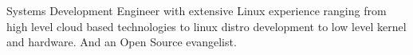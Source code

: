 Systems Development Engineer with extensive Linux experience ranging
from high level cloud based technologies to linux distro development
to low level kernel and hardware.
And an Open Source evangelist.
